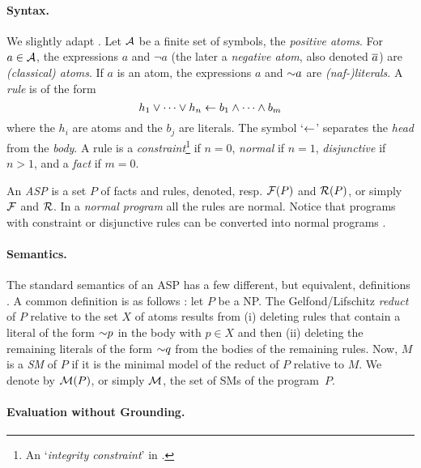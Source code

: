 \documentclass[x11names]{tlp}
\renewcommand{\cite}{\citep}
\begin{document}
\paragraph{Syntax.}
\label{par:syntax}

We slightly adapt \cite{calimeri2020aspcore}. Let ${\mathcal{A}}$ be a finite set of symbols, the \emph{positive atoms}. 
For $a \in {\mathcal{A}}$, the expressions $a$ and $\neg a$ (the later a \emph{negative atom}, also denoted $\overline{a}$) are \emph{(classical) atoms}.
If $a$ is an atom, the expressions $a$ and $\operatorname{\sim\!} a$ are \emph{(naf-)literals}.
%
A \textit{rule} is of the form
$$
h_1 \vee \cdots \vee h_n \leftarrow 
	b_1 \wedge \cdots \wedge b_m
$$
where the $h_i$ are atoms and the $b_j$ are literals. 
The symbol `$\leftarrow$' separates the \textit{head} from the \textit{body}. 
A rule is a \emph{constraint}\footnote{An `\emph{integrity constraint}' in \cite{calimeri2020aspcore}.} if $n = 0$, \emph{normal} if $n = 1$, \emph{disjunctive} if $n > 1$, and a \emph{fact} if $m = 0$.

An \textit{\acf{ASP}} is a set $P$ of facts and rules, denoted, resp. $\FACTSset\at{P}$ and $\RULESset\at{P}$, or simply ${\mathcal{F}}$ and ${\mathcal{R}}$.
In a \textit{normal program} all the rules are normal.
Notice that programs with constraint or disjunctive rules can be converted into normal programs \cite{gebser2022answer}.

\paragraph{Semantics.}

The standard semantics of an \ac{ASP} has a few different, but equivalent, definitions \cite{lifschitz2008twelve}.
A common definition is as follows \cite{gelfond1988stable}: let $P$ be a \acl{NP}.
The Gelfond/Lifschitz \emph{reduct} of $P$ relative to the set $X$ of atoms results from (i) deleting rules that contain a literal of the form $\operatorname{\sim\!} p$ in the body with $p \in X$ and then (ii) deleting the remaining literals of the form $\operatorname{\sim\!} q$ from the bodies of the remaining rules.
Now, $M$ is a \textit{\acf{SM}} of $P$ if it is the minimal model of the reduct of $P$ relative to $M$.
We denote by $\MODELset\at{P}$, or simply ${\mathcal{M}}$, the set of \aclp{SM} of the program~$P$.

\paragraph{Evaluation without Grounding.}
\end{document}
